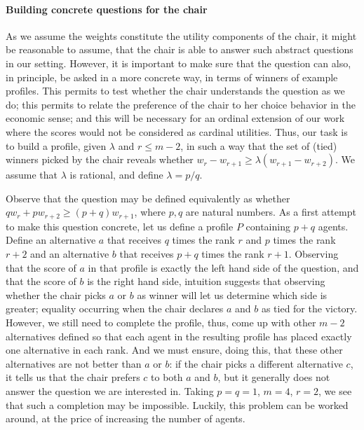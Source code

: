 \paragraph{Building concrete questions for the chair}
As we assume the weights constitute the utility components of the chair, it might be reasonable to assume, 
that the chair is able to answer such abstract questions in our setting. However, it is important to make sure that the question can also, in principle, be asked in a more concrete way, in terms of winners of example profiles. This permits to test whether the chair understands the question as we do; this permits to relate the preference of the chair  to her choice behavior in the economic sense; and this will be necessary for an ordinal extension of our work where the scores would not be considered as cardinal utilities.
Thus, our task is to build a profile, given $\lambda$ and $r ≤ m-2$, in such a way that the set of (tied) winners picked by the chair reveals whether $w_{r} - w_{r+1} \geq \lambda (w_{r+1} - w_{r+2})$.
We assume that $\lambda$ is rational, and define $\lambda = p/q$.

Observe that the question may be defined equivalently as whether $q w_{r} + p w_{r+2} ≥ (p + q) w_{r+1}$, where $p, q$ are natural numbers. 
As a first attempt to make this question concrete, let us define a profile $P$ containing $p+q$ agents. 
Define an alternative $a$ that receives $q$ times the rank $r$ and $p$ times the rank $r+2$ and an alternative $b$ that receives $p+q$ times the rank $r+1$. 
Observing that the score of $a$ in that profile is exactly the left hand side of the question, and that the score of $b$ is the right hand side, intuition suggests that observing whether the chair picks $a$ or $b$ as winner will let us determine which side is greater; equality occurring when the chair declares $a$ and $b$ as tied for the victory. 
However, we still need to complete the profile, thus, come up with other $m-2$ alternatives defined so that each agent in the resulting profile has placed exactly one alternative in each rank. 
And we must ensure, doing this, that these other alternatives are not better than $a$ or $b$: if the chair picks a different alternative $c$, it tells us that the chair prefers $c$ to both $a$ and $b$, 
but it generally does not  answer the question we are interested in. 
Taking $p = q = 1$, $m=4$, $r=2$, we see that such a completion may be impossible. Luckily, this problem can be worked around, at the price of increasing the number of agents. 


